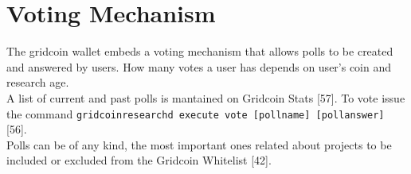 \section{Voting Mechanism}

The gridcoin wallet embeds a voting mechanism that allows polls to be created and answered by users. How many votes a user has depends on user's coin and research age.\\

A list of current and past polls is mantained on Gridcoin Stats [57]. To vote issue the command \texttt{gridcoinresearchd execute vote [pollname] [pollanswer]} [56].\\

Polls can be of any kind, the most important ones related about projects to be included or excluded from the Gridcoin Whitelist [42].